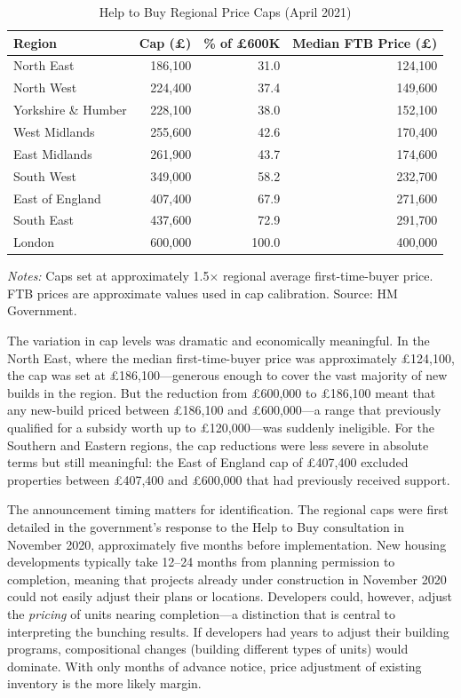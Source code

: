 \documentclass[12pt]{article}
\begin{document}
\begin{table}[H]
\centering
\caption{Help to Buy Regional Price Caps (April 2021)}
\label{tab:caps}
\begin{tabular}{lrrr}
\toprule
Region & Cap (\pounds) & \% of \pounds600K & Median FTB Price (\pounds) \\
\midrule
North East & 186,100 & 31.0 & 124,100 \\
North West & 224,400 & 37.4 & 149,600 \\
Yorkshire \& Humber & 228,100 & 38.0 & 152,100 \\
West Midlands & 255,600 & 42.6 & 170,400 \\
East Midlands & 261,900 & 43.7 & 174,600 \\
South West & 349,000 & 58.2 & 232,700 \\
East of England & 407,400 & 67.9 & 271,600 \\
South East & 437,600 & 72.9 & 291,700 \\
London & 600,000 & 100.0 & 400,000 \\
\bottomrule
\end{tabular}
\begin{minipage}{0.9\textwidth}
\vspace{0.3em}
\footnotesize \textit{Notes:} Caps set at approximately 1.5$\times$ regional average first-time-buyer price. FTB prices are approximate values used in cap calibration. Source: HM Government.
\end{minipage}
\end{table}

The variation in cap levels was dramatic and economically meaningful. In the North East, where the median first-time-buyer price was approximately \pounds124,100, the cap was set at \pounds186,100---generous enough to cover the vast majority of new builds in the region. But the reduction from \pounds600,000 to \pounds186,100 meant that any new-build priced between \pounds186,100 and \pounds600,000---a range that previously qualified for a subsidy worth up to \pounds120,000---was suddenly ineligible. For the Southern and Eastern regions, the cap reductions were less severe in absolute terms but still meaningful: the East of England cap of \pounds407,400 excluded properties between \pounds407,400 and \pounds600,000 that had previously received support.

The announcement timing matters for identification. The regional caps were first detailed in the government's response to the Help to Buy consultation in November 2020, approximately five months before implementation. New housing developments typically take 12--24 months from planning permission to completion, meaning that projects already under construction in November 2020 could not easily adjust their plans or locations. Developers could, however, adjust the \textit{pricing} of units nearing completion---a distinction that is central to interpreting the bunching results. If developers had years to adjust their building programs, compositional changes (building different types of units) would dominate. With only months of advance notice, price adjustment of existing inventory is the more likely margin.
\end{document}
